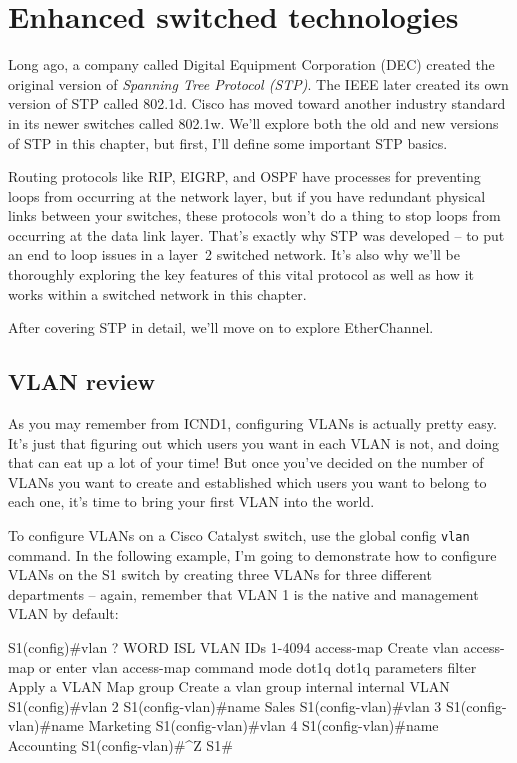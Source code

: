 \chapter{Enhanced switched technologies}

Long ago, a company called Digital Equipment Corporation (DEC) created the
original version of \emph{Spanning Tree Protocol (STP)}. The IEEE later
created its own version of STP called 802.1d. Cisco has moved toward
another industry standard in its newer switches called 802.1w. We'll
explore both the old and new versions of STP in this chapter, but first,
I'll define some important STP basics.

Routing protocols like RIP, EIGRP, and OSPF have processes for
preventing loops from occurring at the network layer, but if you have
redundant physical links between your switches, these protocols won't do
a thing to stop loops from occurring at the data link layer.
That's exactly why STP was developed -- to put an end to loop issues in a layer~2 switched network.
It's also why we'll be thoroughly exploring the key features of this vital protocol as well as how it works within a
switched network in this chapter.

After covering STP in detail, we'll move on to explore EtherChannel.


\section{VLAN review}

As you may remember from ICND1, configuring VLANs is actually pretty
easy. It's just that figuring out which users you want in each VLAN is
not, and doing that can eat up a lot of your time! But once you've
decided on the number of VLANs you want to create and established which
users you want to belong to each one, it's time to bring your first VLAN
into the world.

To configure VLANs on a Cisco Catalyst switch, use the global config
\texttt{vlan} command. In the following example, I'm going to
demonstrate how to configure VLANs on the S1 switch by creating three
VLANs for three different departments -- again, remember that VLAN 1 is
the native and management VLAN by default:

\begin{cli}
S1(config)#vlan ?
  WORD        ISL VLAN IDs 1-4094
  access-map  Create vlan access-map or enter vlan access-map command mode
  dot1q       dot1q parameters
  filter      Apply a VLAN Map
  group       Create a vlan group
  internal    internal VLAN
S1(config)#vlan 2
S1(config-vlan)#name Sales
S1(config-vlan)#vlan 3
S1(config-vlan)#name Marketing
S1(config-vlan)#vlan 4
S1(config-vlan)#name Accounting
S1(config-vlan)#^Z
S1#
\end{cli}

